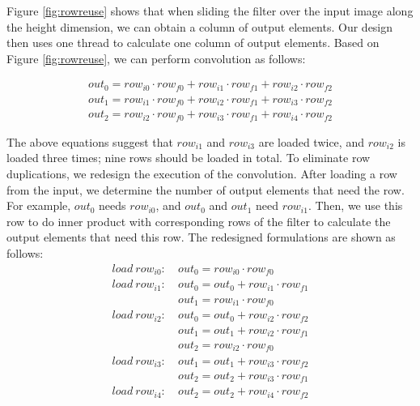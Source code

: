 Figure \ref{fig:rowreuse} shows that when sliding the filter over the input image along the height dimension, we can obtain a column of output elements. Our design then uses one thread to calculate one column of output elements. Based on Figure \ref{fig:rowreuse},
we can perform convolution as follows:

\begin{gather*}
  out_0=row_{i0} \cdot row_{f0} + row_{i1} \cdot row_{f1} + row_{i2} \cdot row_{f2} \\
out_{1}=row_{i1} \cdot row_{f0} + row_{i2} \cdot row_{f1} + row_{i3} \cdot row_{f2} \\
out_{2}=row_{i2} \cdot row_{f0} + row_{i3} \cdot row_{f1} + row_{i4} \cdot row_{f2}
\end{gather*}

The above equations suggest that $row_{i1}$ and $row_{i3}$ are loaded twice, and $row_{i2}$ is loaded three times; nine rows should be loaded in total. To eliminate row duplications, we redesign the execution of the convolution. After loading a row from the input, we determine the number of output elements that need the row. For example, $out_0$ needs $row_{i0}$, and $out_0$ and $out_1$ need $row_{i1}$. Then, we use
this row to do inner product with corresponding rows of the filter to calculate the output elements that need this row. The redesigned formulations are shown as follows:
\begin{equation}\nonumber
\begin{aligned}
load\ row_{i0}:
&\ out_0=row_{i0} \cdot row_{f0} \\
load\ row_{i1}:
&\ out_0 = out_0+row_{i1} \cdot row_{f1}\\
&\ out_1=row_{i1} \cdot row_{f0}\\
load\ row_{i2}:
&\ out_0 = out_0+row_{i2} \cdot row_{f2}\\
&\ out_1 = out_1+row_{i2} \cdot row_{f1}\\
&\ out_{2}=row_{i2} \cdot row_{f0}\\
load\ row_{i3}:
&\ out_1=out_1+row_{i3} \cdot row_{f2} \\
&\ out_2=out_2+row_{i3} \cdot row_{f1}\\
load\ row_{i4}:
&\ out_2=out_2+row_{i4} \cdot row_{f2}
\end{aligned}	
\end{equation}



